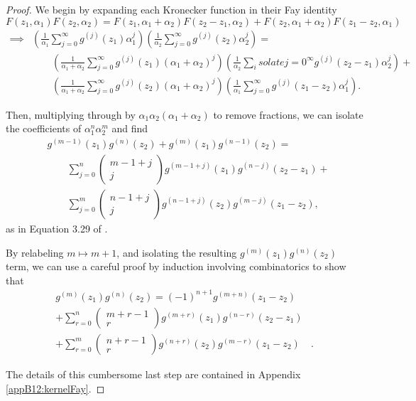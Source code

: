 \begin{proof}
    We begin by expanding each Kronecker function in their Fay identity
    \begin{equation}
        {F}(z_1,\alpha_1){F}(z_2,\alpha_2) = {F}(z_1,\alpha_1+\alpha_2){F}(z_2-z_1,\alpha_2) + {F}(z_2,\alpha_1+\alpha_2){F}(z_1-z_2,\alpha_1)
    \end{equation}
    \begin{align}
        \implies & \left(\frac{1}{\alpha_1} \sum_{j=0}^{\infty} g^{(j)}(z_1) \alpha_1^j\right)
        \left(\frac{1}{\alpha_2} \sum_{j=0}^{\infty} g^{(j)}(z_2) \alpha_2^j\right) =
        \\ & \quad \quad \left(\frac{1}{\alpha_1+\alpha_2} \sum_{j=0}^{\infty} g^{(j)}(z_1) (\alpha_1+\alpha_2)^j\right)
        \left(\frac{1}{\alpha_2} \sum_isolate {j=0}^{\infty} g^{(j)}(z_2-z_1) \alpha_2^j\right) +
        \\ & \quad \quad \left(\frac{1}{\alpha_1+\alpha_2} \sum_{j=0}^{\infty} g^{(j)}(z_2) (\alpha_1+\alpha_2)^j\right)
        \left(\frac{1}{\alpha_1} \sum_{j=0}^{\infty} g^{(j)}(z_1-z_2) \alpha_1^j\right).
    \end{align}

    Then, multiplying through by $\alpha_1\alpha_2(\alpha_1+\alpha_2)$ to remove fractions, we can isolate the coefficients of $\alpha_1^n \alpha_2^m$ and find
    \begin{align}
        & g^{(m-1)}(z_1)g^{(n)}(z_2)+g^{(m)}(z_1)g^{(n-1)}(z_2) = \label{eqnB12:kernelFaySTART}
        \\ & \quad \quad \sum_{j=0}^{n} \begin{pmatrix} m-1+j \\ j \end{pmatrix} g^{(m-1+j)}(z_1) g^{(n-j)}(z_2-z_1) +
        \\ & \quad \quad \sum_{j=0}^{m} \begin{pmatrix} n-1+j \\ j \end{pmatrix} g^{(n-1+j)}(z_2) g^{(m-j)}(z_1-z_2),
    \end{align}
    as in Equation 3.29 of \cite{Broedel_2015}.

    By relabeling $m \mapsto m+1$, and isolating the resulting $g^{(m)}(z_1)g^{(n)}(z_2)$ term, we can use a careful proof by induction involving combinatorics to show that
    \begin{align}
        g^{(m)}(z_1) g^{(n)}(z_2) = (-1)^{n+1} g^{(m+n)}(z_1-z_2)& \\
         +\sum_{r=0}^n \begin{pmatrix} m+r-1 \\ r \end{pmatrix} g^{(m+r)}(z_1) g^{(n-r)}(z_2-z_1) & \\
         +\sum_{r=0}^m \begin{pmatrix} n+r-1 \\ r \end{pmatrix} g^{(n+r)}(z_2) g^{(m-r)}(z_1-z_2) & .
    \end{align}

    The details of this cumbersome last step are contained in Appendix \ref{appB12:kernelFay}.
\end{proof}

